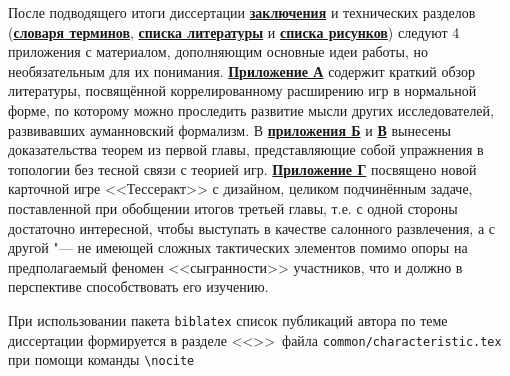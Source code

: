 

%

После подводящего итоги диссертации \underline{\textbf{заключения}} и технических разделов (\underline{\textbf{словаря терминов}}, \underline{\textbf{списка литературы}} и \underline{\textbf{списка рисунков}}) следуют 4 приложения с материалом, дополняющим основные идеи работы, но необязательным для их понимания. \underline{\textbf{Приложение А}} содержит краткий обзор литературы, посвящённой коррелированному расширению игр в нормальной форме, по которому можно проследить развитие мысли других исследователей, развивавших ауманновский формализм. В \underline{\textbf{приложения Б}} и \underline{\textbf{В}} вынесены доказательства теорем из первой главы, представляющие собой упражнения в топологии без тесной связи с теорией игр. \underline{\textbf{Приложение Г}} посвящено новой карточной игре <<Тессеракт>> с дизайном, целиком подчинённым задаче, поставленной при обобщении итогов третьей главы, т.е. с одной стороны достаточно интересной, чтобы выступать в качестве салонного развлечения, а с другой "--- не имеющей сложных тактических элементов помимо опоры на предполагаемый феномен <<сыгранности>> участников, что и должно в перспективе способствовать его изучению.

При использовании пакета \verb!biblatex! список публикаций автора по теме
диссертации формируется в разделе <<\publications>>\ файла
\verb!common/characteristic.tex!  при помощи команды \verb!\nocite!

